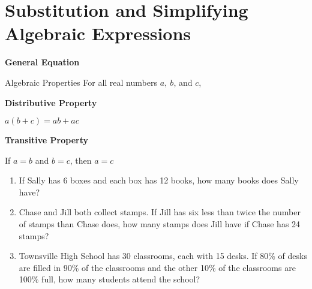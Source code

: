 \section[Algebraic Expressions]{Substitution and Simplifying Algebraic Expressions}

\textbf{General Equation}

\bigskip
\begin{equationbox}{Algebraic Properties}
\setlength{\columnseprule}{0pt}
For all real numbers $a,\ b$, and $c$,

\begin{center}
\begin{multicols}{2}
\textbf{Distributive Property}

$a(b+c)=ab+ac$

\columnbreak
\textbf{Transitive Property}

If $a=b$ and $b=c$, then $a=c$
\end{multicols}
\end{center}
\end{equationbox}

\bigskip
\begin{enumerate}[labelindent=*,style=multiline,leftmargin=*,label=\textbf{Example \arabic*:}]
\item If Sally has 6 boxes and each box has 12 books, how many books does Sally have?

\vfill\item Chase and Jill both collect stamps. If Jill has six less than twice the number of stamps than Chase does, how many stamps does Jill have if Chase has 24 stamps?

\vfill\item Townsville High School has 30 classrooms, each with 15 desks. If 80\% of desks are filled in 90\% of the classrooms and the other 10\% of the classrooms are 100\% full, how many students attend the school?
\end{enumerate}


